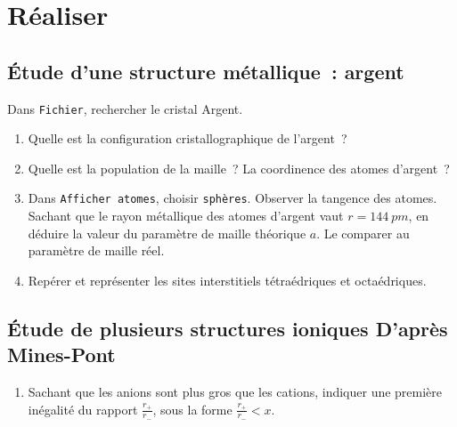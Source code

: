 \documentclass[a4paper, 10pt, final, garamond]{book}
\begin{document}
\section{Réaliser}
\label{sec:real}
\subsection{Étude d'une structure métallique~: argent}
\label{ssec:ag}
Dans \texttt{Fichier}, rechercher le cristal Argent.
\begin{enumerate}[label=\sqenumi]
  \item Quelle est la configuration cristallographique de l'argent~?
  \item Quelle est la population de la maille~? La coordinence des atomes
    d'argent~?
  \item Dans \texttt{Afficher atomes}, choisir \texttt{sphères}. Observer la
    tangence des atomes. Sachant que le rayon métallique des atomes d'argent
    vaut $r = \SI{144}{pm}$, en déduire la valeur du paramètre de maille
    théorique $a$. Le comparer au paramètre de maille réel.
  \item Repérer et représenter les sites interstitiels tétraédriques et
    octaédriques.
\end{enumerate}

\subsection{Étude de plusieurs structures ioniques \hfill \small D'après
Mines-Pont}
\label{ssec:ions}
\begin{enumerate}[label=\sqenumi, start=5]
  \item Sachant que les anions sont plus gros que les cations, indiquer une
    première inégalité du rapport $\frac{r_{+}}{r_{-}}$, sous la forme
    $\frac{r_{+}}{r_{-}} < x$.
\end{enumerate}
\end{document}
